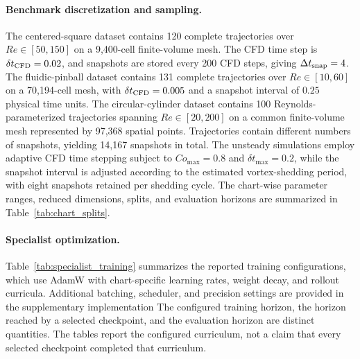 \documentclass{article}
\providecommand{\DIFaddtex}[1]{{\protect\color{blue} \sf #1}} %
\providecommand{\DIFdeltex}[1]{{\protect\color{red} \scriptsize #1}} %
\providecommand{\DIFaddbegin}{} %
\providecommand{\DIFaddend}{} %
\providecommand{\DIFdelbegin}{} %
\providecommand{\DIFdelend}{} %
\providecommand{\DIFadd}[1]{\texorpdfstring{\DIFaddtex{#1}}{#1}} %
\providecommand{\DIFdel}[1]{\texorpdfstring{\DIFdeltex{#1}}{}} %
\providecommand{\DIFscaledelfig}{0.5}
\newlength{\DIFdelgraphicswidth} %
\newlength{\DIFdelgraphicsheight} %
\providecommand{\DIFaddincludegraphics}[2][]{{\color{blue}\fbox{\DIFOincludegraphics[#1]{#2}}}} %
\providecommand{\DIFdelincludegraphics}[2][]{%
\sbox{\DIFdelgraphicsbox}{\DIFOincludegraphics[#1]{#2}}%
\settoboxwidth{\DIFdelgraphicswidth}{\DIFdelgraphicsbox} %
\settoboxtotalheight{\DIFdelgraphicsheight}{\DIFdelgraphicsbox} %
\scalebox{\DIFscaledelfig}{%
\parbox[b]{\DIFdelgraphicswidth}{\usebox{\DIFdelgraphicsbox}\\[-\baselineskip] \rule{\DIFdelgraphicswidth}{0em}}\llap{\resizebox{\DIFdelgraphicswidth}{\DIFdelgraphicsheight}{%
\setlength{\unitlength}{\DIFdelgraphicswidth}%
\begin{picture}(1,1)%
\thicklines\linethickness{2pt} %
{\color[rgb]{1,0,0}\put(0,0){\framebox(1,1){}}}%
{\color[rgb]{1,0,0}\put(0,0){\line( 1,1){1}}}%
{\color[rgb]{1,0,0}\put(0,1){\line(1,-1){1}}}%
\end{picture}%
}\hspace*{3pt}}} %
} %
\DeclareRobustCommand{\DIFaddbegin}{\DIFOaddbegin \let\includegraphics\DIFaddincludegraphics} %
\DeclareRobustCommand{\DIFaddend}{\DIFOaddend \let\includegraphics\DIFOincludegraphics} %
\DeclareRobustCommand{\DIFdelbegin}{\DIFOdelbegin \let\includegraphics\DIFdelincludegraphics} %
\DeclareRobustCommand{\DIFdelend}{\DIFOaddend \let\includegraphics\DIFOincludegraphics} %
\begin{document}
\paragraph{Benchmark discretization and sampling.}
The centered-square dataset contains 120 complete trajectories over
$Re\in[50,150]$ on a 9,400-cell finite-volume mesh. The CFD time step is $\delta t_{\rm CFD}=0.02$, and snapshots are stored every 200 CFD steps, giving $\Delta t_{\rm snap}=4$. The fluidic-pinball dataset contains 131 complete trajectories over $Re\in[10,60]$ on a 70,194-cell mesh, with $\delta t_{\rm CFD}=0.005$ and a snapshot interval of $0.25$ physical time units. The circular-cylinder dataset contains 100 Reynolds-parameterized trajectories spanning
$Re\in[20,200]$ on a common finite-volume mesh represented by 97,368 spatial points. Trajectories contain different numbers of snapshots, yielding 14,167 snapshots in total. The unsteady simulations employ adaptive CFD time stepping subject to $Co_{\max}=0.8$ and $\delta t_{\max}=0.2$, while the snapshot interval is adjusted according to the estimated vortex-shedding period, with eight snapshots retained per shedding cycle. The chart-wise parameter ranges, reduced dimensions, splits, and evaluation horizons are summarized in Table~\ref{tab:chart_splits}.


\paragraph{Specialist optimization.}
Table~\ref{tab:specialist_training} summarizes the reported training configurations, which use AdamW with chart-specific learning rates, weight decay, and rollout curricula.
\DIFdelbegin \DIFdel{Additional batching, scheduler, and precision settings are provided in the supplementary implementation}\DIFdelend \DIFaddbegin \DIFadd{The configured training horizon, the horizon reached by a selected checkpoint, and the evaluation horizon are distinct quantities. The tables report the configured curriculum, not a claim that every selected checkpoint completed that curriculum}\DIFaddend .
\end{document}
